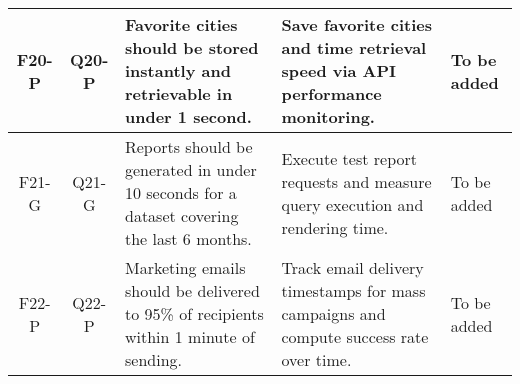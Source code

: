 \begin{longtable}{|c|c|p{4.5cm}|p{3.5cm}|p{3.5cm}|}
    \hline
    F20-P & Q20-P & Favorite cities should be stored instantly and retrievable in under 1 second. & Save favorite cities and time retrieval speed via API performance monitoring. & To be added \\
    \hline
    F21-G & Q21-G & Reports should be generated in under 10 seconds for a dataset covering the last 6 months. & Execute test report requests and measure query execution and rendering time. & To be added \\
    \hline
    F22-P & Q22-P & Marketing emails should be delivered to 95\% of recipients within 1 minute of sending. & Track email delivery timestamps for mass campaigns and compute success rate over time. & To be added \\
    \hline

\end{longtable}




